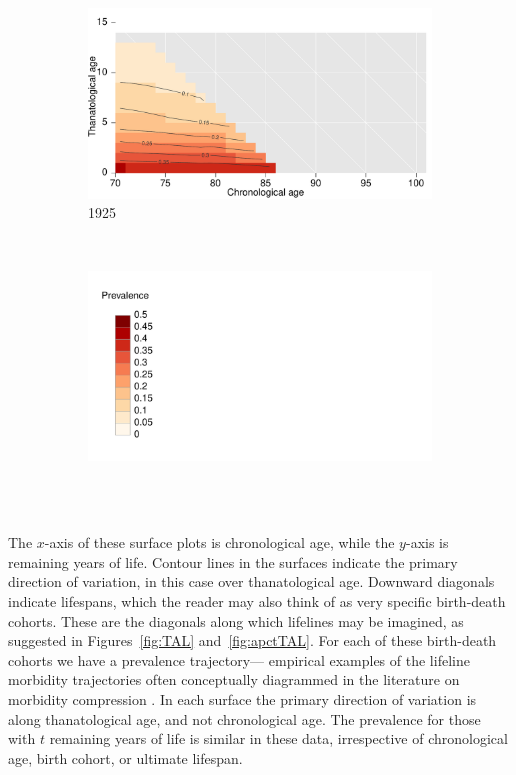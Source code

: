 \documentclass[12pt,oneside,a4paper]{article} %
\begin{document}
\begin{figure}[h!]
\begin{subfigure}{.46\textwidth}
\centering
\caption{1925}
\vspace{-1em}
\label{fig:srh1925}
\includegraphics[scale=0.32]{Figures/TALapplication/srhpoor1925.pdf}
\end{subfigure}
~
\begin{subfigure}{.46\textwidth}
\centering
\caption*{~}
\vspace{-1em}
\label{fig:srhlegend}
\includegraphics[scale=0.32]{Figures/TALapplication/Legend.pdf}
\end{subfigure}
\end{figure} 

The $x$-axis of these surface plots is chronological age, while the $y$-axis is
remaining years of life. Contour lines in the surfaces indicate the
primary direction of variation, in this case over thanatological age. Downward
diagonals indicate lifespans, which the reader may also think of as very
specific birth-death cohorts. These are the diagonals along which lifelines may
be imagined, as suggested in Figures~\ref{fig:TAL} and~\ref{fig:apctTAL}. For each
of these birth-death cohorts we have a prevalence trajectory--- empirical examples of the lifeline morbidity trajectories often conceptually diagrammed in the literature on morbidity compression
\citep[e.g.,][]{fries2005frailty}.
In each surface the primary direction of variation is along thanatological age,
and not chronological age. The prevalence for those with $t$ remaining years of
life is similar in these data, irrespective of chronological age, birth cohort,
or ultimate lifespan.
\end{document}
